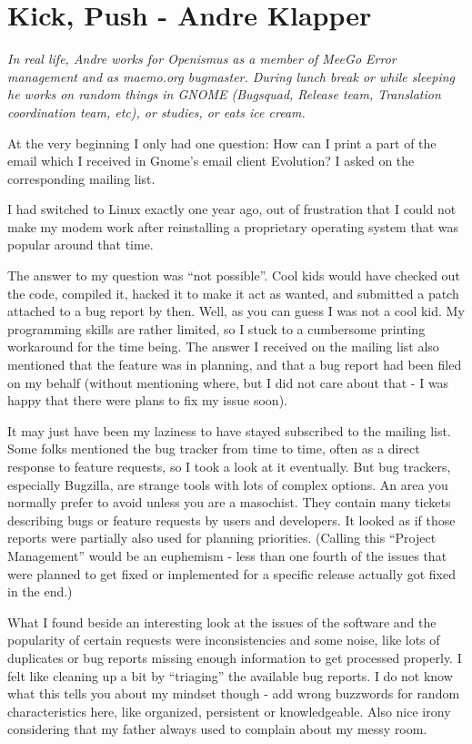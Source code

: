 \chapter{Kick, Push - Andre Klapper}

\textit{In real life, Andre works for Openismus as a member of MeeGo Error
management and as maemo.org bugmaster. During lunch break or while
sleeping he works on random things in GNOME (Bugsquad, Release team,
Translation coordination team, etc), or studies, or eats ice cream.}

At the very beginning I only had one question: How can I print a part of the
email which I received in Gnome's email client Evolution? I asked on the
corresponding mailing list.

I had switched to Linux exactly one year ago, out of frustration that I
could not make my modem work after reinstalling a proprietary operating system
that was popular around that time.

The answer to my question was ``not possible''. Cool kids would have checked out
the code, compiled it, hacked it to make it act as wanted, and submitted a patch
attached to a bug report by then. Well, as you can guess I was not a cool kid.
My programming skills are rather limited, so I stuck to a cumbersome printing
workaround for the time being. The answer I received on the mailing list also
mentioned that the feature was in planning, and that a bug report had been filed
on my behalf (without mentioning where, but I did not care about that - I was
happy that there were plans to fix my issue soon).

It may just have been my laziness to have stayed subscribed to the mailing list.
Some folks mentioned the bug tracker from time to time, often as a direct
response to feature requests, so I took a look at it eventually. But bug
trackers, especially Bugzilla, are strange tools with lots of complex options.
An area you normally prefer to avoid unless you are a masochist. They contain
many tickets describing bugs or feature requests by users and developers. It
looked as if those reports were partially also used for planning priorities.
(Calling this ``Project Management'' would be an euphemism - less than one
fourth of the issues that were planned to get fixed or implemented for a
specific release actually got fixed in the end.)

What I found beside an interesting look at the issues of the software and the
popularity of certain requests were inconsistencies and some noise, like lots of
duplicates or bug reports missing enough information to get processed properly.
I felt like cleaning up a bit by ``triaging'' the available bug reports. I do
not know what this tells you about my mindset though - add wrong buzzwords for
random characteristics here, like organized, persistent or knowledgeable. Also
nice irony considering that my father always used to complain about my messy
room.

